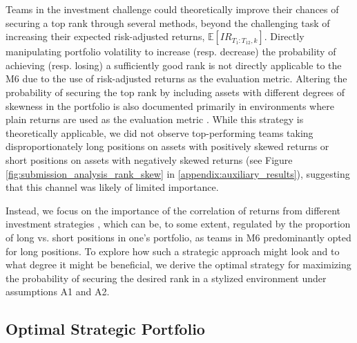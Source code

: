\documentclass[3p,times,twocolumn]{elsarticle}
\begin{document}
Teams in the investment challenge could theoretically improve their chances of securing a top rank through several methods, beyond the challenging task of increasing their expected risk-adjusted returns, $\mathbb{E}[IR_{T_{1}:T_{12},k}]$.
Directly manipulating portfolio volatility to increase (resp. decrease) the probability of achieving (resp. losing) a sufficiently good rank \citep[see, e.g.,][]{brownTournamentsTemptationsAnalysis1996,eltonIncentiveFeesMutual2003} is not directly applicable to the M6 due to the use of risk-adjusted returns as the evaluation metric.
Altering the probability of securing the top rank by including assets with different degrees of skewness in the portfolio is also documented primarily in environments where plain returns are used as the evaluation metric \citep[see, e.g.,][]{linFundConvexityTail2011,dijkRankMattersImpact2014}.
While this strategy is theoretically applicable, we did not observe top-performing teams taking disproportionately long positions on assets with positively skewed returns or short positions on assets with negatively skewed returns (see Figure \ref{fig:submission_analysis_rank_skew} in \ref{appendix:auxiliary_results}), suggesting that this channel was likely of limited importance.

Instead, we focus on the importance of the correlation of returns from different investment strategies \citep[see, e.g.,][]{niekenRisktakingTournamentsTheory2010,krasnyAssetPricingStatus2011}, which can be, to some extent, regulated by the proportion of long vs. short positions in one's portfolio, as teams in M6 predominantly opted for long positions.
To explore how such a strategic approach might look and to what degree it might be beneficial, we derive the optimal strategy for maximizing the probability of securing the desired rank in a stylized environment under assumptions A1 and A2.

\subsection{Optimal Strategic Portfolio}\label{subsection:strategic_portfolio}
\end{document}
